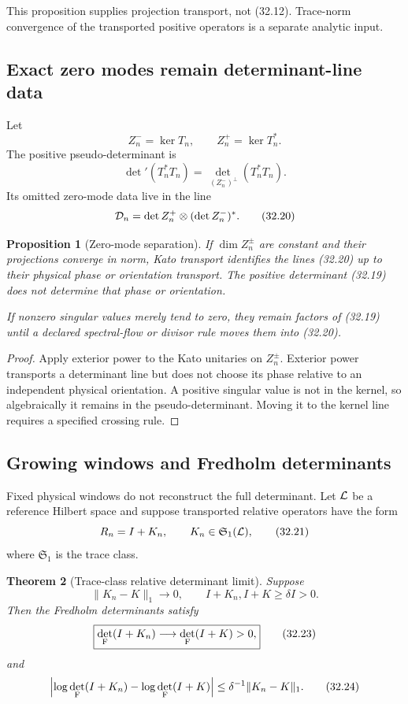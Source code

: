 \documentclass[11pt]{article}
\newtheorem{theorem}{Theorem}[section]
\newtheorem{proposition}[theorem]{Proposition}
\theoremstyle{remark}
\begin{document}
This proposition supplies projection transport, not (32.12).
Trace-norm convergence of the transported positive operators is a
separate analytic input.

\subsection{Exact zero modes remain determinant-line data}

Let
\[
 Z_n^-=\ker T_n,\qquad Z_n^+=\ker T_n^*.                    \tag{32.18}
\]
The positive pseudo-determinant is
\[
 \det{}'(T_n^*T_n)
 =
 \det_{\,(Z_n^-)^\perp}(T_n^*T_n).                         \tag{32.19}
\]
Its omitted zero-mode data live in the line
\[
 {\cal D}_n
 =
 \det Z_n^+\otimes(\det Z_n^-)^*.                          \tag{32.20}
\]

\begin{proposition}[Zero-mode separation]
\label{prop:v15v32-zero}
If \(\dim Z_n^\pm\) are constant and their projections converge in
norm, Kato transport identifies the lines (32.20) up to their
physical phase or orientation transport.  The positive determinant
(32.19) does not determine that phase or orientation.

If nonzero singular values merely tend to zero, they remain factors
of (32.19) until a declared spectral-flow or divisor rule moves them
into (32.20).
\end{proposition}

\begin{proof}
Apply exterior power to the Kato unitaries on \(Z_n^\pm\).
Exterior power transports a determinant line but does not choose its
phase relative to an independent physical orientation.  A positive
singular value is not in the kernel, so algebraically it remains in
the pseudo-determinant.  Moving it to the kernel line requires a
specified crossing rule.
\end{proof}

\subsection{Growing windows and Fredholm determinants}

Fixed physical windows do not reconstruct the full determinant.
Let \({\cal L}\) be a reference Hilbert space and suppose transported
relative operators have the form
\[
 R_n=I+K_n,\qquad K_n\in{\mathfrak S}_1({\cal L}),          \tag{32.21}
\]
where \({\mathfrak S}_1\) is the trace class.

\begin{theorem}[Trace-class relative determinant limit]
\label{thm:v15v32-fredholm}
Suppose
\[
 \|K_n-K\|_1\longrightarrow0,\qquad
 I+K_n,I+K\ge\delta I>0.                                   \tag{32.22}
\]
Then the Fredholm determinants satisfy
\[
 \boxed{
 \det_{\rm F}(I+K_n)\longrightarrow\det_{\rm F}(I+K)>0,}    \tag{32.23}
\]
and
\[
 \left|
 \log\det_{\rm F}(I+K_n)
 -\log\det_{\rm F}(I+K)
 \right|
 \le\delta^{-1}\|K_n-K\|_1.                                \tag{32.24}
\]
\end{theorem}
\end{document}
